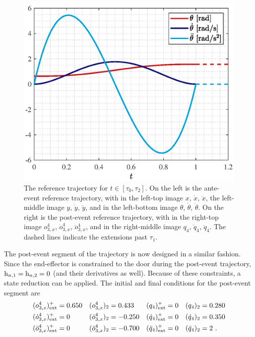 \documentclass[../DC2019003Bouma.tex]{subfiles}
\begin{document}
\begin{figure}[bt!]
\begin{minipage}[l]{.5\textwidth}
\centering
\includegraphics[width=\textwidth]{thtraj01.eps}
\end{minipage}
\caption{The reference trajectory for $t\in[\tau_0,\tau_2]$. On the left is the ante-event reference trajectory, with in the left-top image $x$, $\dot{x}$, $\ddot{x}$, the left-middle image $y$, $\dot{y}$, $\ddot{y}$, and in the left-bottom image $\theta$, $\dot{\theta}$, $\ddot{\theta}$. On the right is the post-event reference trajectory, with in the right-top image $o_{3,x}^4$, $\dot{o}_{3,x}^4$, $\ddot{o}_{3,x}^4$, and in the right-middle image $q_4$, $\dot{q}_4$, $\ddot{q}_4$. The dashed lines indicate the extensions past $\tau_1$.}
\label{fig:5traj}
\end{figure}
The post-event segment of the trajectory is now designed in a similar fashion. Since the end-effector is constrained to the door during the post-event trajectory, $\mathrm{h}_{n,1} = \mathrm{h}_{n,2} = 0$ (and their derivatives as well). Because of these constraints, a state reduction can be applied. The initial and final conditions for the post-event segment are
\begin{align}
(o_{3,x}^4)^+_{\textnormal{ext}}&= 0.650 &(o_{3,x}^4)_2&= 0.433 &(q_4)^+_{\textnormal{ext}}&= 0 &(q_4)_2&= 0.280\nonumber\\
(\dot{o}_{3,x}^4)^+_{\textnormal{ext}}&= 0 &(\dot{o}_{3,x}^4)_2&= -0.250 &(\dot{q}_4)^+_{\textnormal{ext}}&= 0 &(\dot{q}_4)_2&= 0.350 \label{eq:5traj12}\\
(\ddot{o}_{3,x}^4)^+_{\textnormal{ext}}&= 0 &(\ddot{o}_{3,x}^4)_2&= -0.700 &(\ddot{q}_4)^+_{\textnormal{ext}}&= 0 &(\ddot{q}_4)_2&= 2\ .\nonumber
\end{align}
\end{document}
